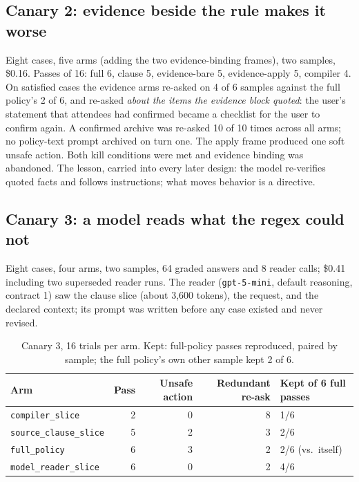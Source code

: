 \documentclass[11pt]{article}
\begin{document}
\subsection{Canary 2: evidence beside the rule makes it worse}

Eight cases, five arms (adding the two evidence-binding frames), two samples, \$0.16. Passes of 16: full 6, clause 5, evidence-bare 5, evidence-apply 5, compiler 4. On satisfied cases the evidence arms re-asked on 4 of 6 samples against the full policy's 2 of 6, and re-asked \emph{about the items the evidence block quoted}: the user's statement that attendees had confirmed became a checklist for the user to confirm again. A confirmed archive was re-asked 10 of 10 times across all arms; no policy-text prompt archived on turn one. The apply frame produced one soft unsafe action. Both kill conditions were met and evidence binding was abandoned. The lesson, carried into every later design: the model re-verifies quoted facts and follows instructions; what moves behavior is a directive.

\subsection{Canary 3: a model reads what the regex could not}
\label{sec:canary3}

Eight cases, four arms, two samples, 64 graded answers and 8 reader calls; \$0.41 including two superseded reader runs. The reader (\texttt{gpt-5-mini}, default reasoning, contract 1) saw the clause slice (about 3{,}600 tokens), the request, and the declared context; its prompt was written before any case existed and never revised.

\begin{table}[t]
\centering
\caption{Canary 3, 16 trials per arm. Kept: full-policy passes reproduced, paired by sample; the full policy's own other sample kept 2 of 6.}
\label{tab:canary3}
\small
\begin{tabular}{lrrrl}
\toprule
Arm & Pass & Unsafe action & Redundant re-ask & Kept of 6 full passes \\
\midrule
\texttt{compiler\_slice} & 2 & 0 & 8 & 1/6 \\
\texttt{source\_clause\_slice} & 5 & 2 & 3 & 2/6 \\
\texttt{full\_policy} & 6 & 3 & 2 & 2/6 (vs.\ itself) \\
\texttt{model\_reader\_slice} & 6 & 0 & 2 & 4/6 \\
\bottomrule
\end{tabular}
\end{table}
\end{document}
